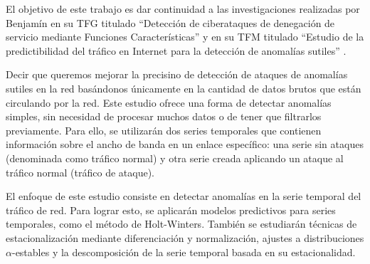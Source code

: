 El objetivo de este trabajo es dar continuidad a las investigaciones realizadas por Benjamín en su
\ac{TFG} titulado ``Detección de ciberataques de denegación de servicio mediante Funciones Características'' \cite{benjamin2021}
y en su \ac{TFM} titulado ``Estudio de la predictibilidad del tráfico en Internet para la detección de anomalías sutiles'' \cite{benjamin2023}.

Decir que queremos mejorar la precisino de detección de ataques de anomalías sutiles en la red
basándonos únicamente en la cantidad de datos brutos que están circulando por la red. Este estudio
ofrece una forma de detectar anomalías simples, sin necesidad de procesar muchos datos o de
tener que filtrarlos previamente.
Para ello, se utilizarán dos series temporales que contienen información
sobre el ancho de banda en un enlace específico: una serie sin ataques (denominada como tráfico normal)
y otra serie creada aplicando un ataque al tráfico normal (tráfico de ataque).

El enfoque de este estudio consiste en detectar anomalías en la serie temporal del tráfico de red.
Para lograr esto, se aplicarán modelos predictivos para series temporales, 
como el método de Holt-Winters. También se estudiarán técnicas de estacionalización mediante diferenciación y normalización,
ajustes a distribuciones $\alpha$-estables y la descomposición de la serie temporal basada en su estacionalidad.